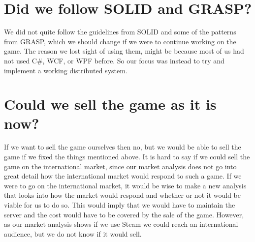 	\section{Did we follow SOLID and GRASP?}
	We did not quite follow the guidelines from SOLID and some of the patterns
   from GRASP, which we should change if we were to continue working on the
    game. The reason we lost sight of using them, might be because most of
    us had not used C\#,  WCF, or WPF before. So our focus was instead to
    try and implement a working distributed system.
	\\
	\section{Could we sell the game as it is now?}
	If we want to sell the game ourselves then no, but we would be able to
  sell the game if we fixed the things mentioned above. It is hard to say
   if we could sell the game on the international market, since our market
    analysis does not go into great detail how the international market
     would respond to such a game. If we were to go on the international
     market, it would be wise to make a new analysis that looks into how
     the market would respond and whether or not it would be viable for us
      to do so. This would imply that we would have to maintain the server
       and the cost would have to be covered by the sale of the game. However,
        as our market analysis shows if we use Steam we could reach an
         international audience, but we do not know if it would sell.
